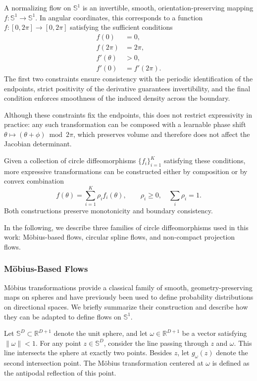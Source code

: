 \documentclass{article}
\begin{document}
A normalizing flow on $\mathbb{S}^1$ is an invertible, smooth, orientation-preserving mapping $f : \mathbb{S}^1 \to \mathbb{S}^1$. In angular coordinates, this corresponds to a function $f : [0, 2\pi] \to [0, 2\pi]$ satisfying the sufficient conditions
\begin{align}
f(0) &= 0, \\
f(2\pi) &= 2\pi, \\
f'(\theta) &> 0, \\
f'(0) &= f'(2\pi).
\end{align}
The first two constraints ensure consistency with the periodic identification of the endpoints, strict positivity of the derivative guarantees invertibility, and the final condition enforces smoothness of the induced density across the boundary.

Although these constraints fix the endpoints, this does not restrict expressivity in practice: any such transformation can be composed with a learnable phase shift $\theta \mapsto (\theta + \phi) \bmod 2\pi$, which preserves volume and therefore does not affect the Jacobian determinant.


Given a collection of circle diffeomorphisms $\{ f_i \}_{i=1}^K$ satisfying these conditions, more expressive transformations can be constructed either by composition or by convex combination
\begin{equation}
\label{eq:convex_combination}
f(\theta) = \sum_{i=1}^K \rho_i f_i(\theta),
\qquad \rho_i \ge 0,
\quad \sum_i \rho_i = 1 .
\end{equation}
Both constructions preserve monotonicity and boundary consistency.

In the following, we describe three families of circle diffeomorphisms used in this work: Möbius-based flows, circular spline flows, and non-compact projection flows.

\subsubsection{Möbius-Based Flows}\label{sec:moebius}

Möbius transformations provide a classical family of smooth, geometry-preserving maps on spheres and have previously been used to define probability distributions on directional spaces. We briefly summarize their construction and describe how they can be adapted to define flows on $\mathbb{S}^1$.

Let $\mathbb{S}^D \subset \mathbb{R}^{D+1}$ denote the unit sphere, and let $\omega \in \mathbb{R}^{D+1}$ be a vector satisfying $\|\omega\| < 1$. For any point $z \in \mathbb{S}^D$, consider the line passing through $z$ and $\omega$. This line intersects the sphere at exactly two points. Besides $z$, let $g_\omega(z)$ denote the second intersection point. The Möbius transformation centered at $\omega$ is defined as the antipodal reflection of this point.
\end{document}

